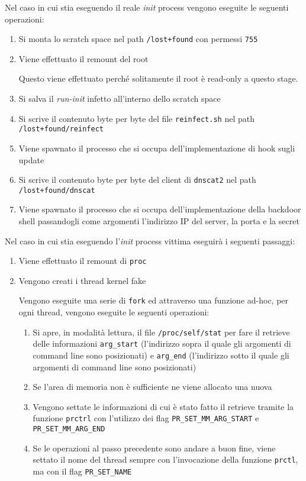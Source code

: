 \documentclass[oneside]{article}
\begin{document}
Nel caso in cui stia eseguendo il reale \textit{init} process vengono eseguite le seguenti operazioni:
\begin{enumerate}
\item Si monta lo scratch space nel path \texttt{/lost+found} con permessi \texttt{755}
\item Viene effettuato il remount del root

Questo viene effettuato perché solitamente il root è read-only a questo stage.
\item Si salva il \textit{run-init} infetto all'interno dello scratch space
\item Si scrive il contenuto byte per byte del file \texttt{reinfect.sh} nel path \texttt{/lost+found/reinfect}
\item Viene spawnato il processo che si occupa dell'implementazione di hook sugli update
\item Si scrive il contenuto byte per byte del client di \texttt{dnscat2} nel path \texttt{/lost+found/dnscat}
\item Viene spawnato il processo che si occupa dell'implementazione della backdoor shell passandogli come argomenti l'indirizzo IP del server, la porta e la secret
\end{enumerate}

Nel caso in cui stia eseguendo l'\textit{init} process vittima eseguirà i seguenti passaggi:
\begin{enumerate}
\item Viene effettuato il remount di \texttt{proc}
\item Vengono creati i thread kernel fake

Vengono eseguite una serie di \texttt{fork} ed attraverso una funzione ad-hoc, per ogni thread, vengono eseguite le seguenti operazioni:
\begin{enumerate}
\item Si apre, in modalità lettura, il file \texttt{/proc/self/stat} per fare il retrieve delle informazioni \texttt{arg\_start} (l'indirizzo sopra il quale gli argomenti di command line sono posizionati) e \texttt{arg\_end} (l'indirizzo sotto il quale gli argomenti di command line sono posizionati)
\item Se l'area di memoria non è sufficiente ne viene allocato una nuova
\item Vengono settate le informazioni di cui è stato fatto il retrieve tramite la funzione \texttt{prctrl} con l'utilizzo dei flag \texttt{PR\_SET\_MM\_ARG\_START} e \texttt{PR\_SET\_MM\_ARG\_END}
\item Se le operazioni al passo precedente sono andare a buon fine, viene settato il nome del thread sempre con l'invocazione della funzione \texttt{prctl}, ma con il flag \texttt{PR\_SET\_NAME}	
\end{enumerate}
\end{enumerate}
\end{document}
